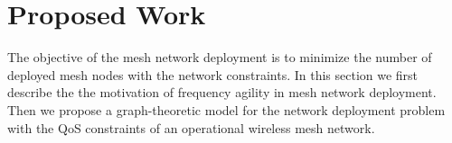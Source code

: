 \chapter{Proposed Work} 
\label{ch:futurework}

The objective of the mesh network deployment is to minimize the number of 
deployed mesh nodes with the network constraints. In this section we first 
describe the the motivation of frequency agility in mesh network deployment. 
Then we propose a graph-theoretic model for the network deployment problem
with the QoS constraints of an operational wireless mesh network.

%
